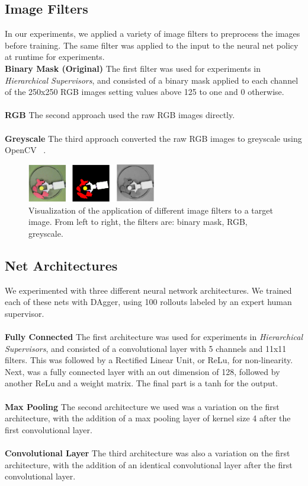 \documentclass[10pt, conference]{ieeeconf}      %
\begin{document}
\subsection{Image Filters}
In our experiments, we applied a variety of image filters to preprocess the images before training. The same filter was applied to the input to the neural net policy at runtime for experiments. \\
\textbf{Binary Mask (Original)}
The first filter was used for experiments in \textit{Hierarchical Supervisors}, and consisted of a binary mask applied to each channel of the 250x250 RGB images setting
values above 125 to one and 0 otherwise. \\
\\
\textbf{RGB}
The second approach used the raw RGB images directly. \\
\\
\textbf{Greyscale}
The third approach converted the raw RGB images to greyscale using OpenCV ~\cite{opencv}. 

\begin{figure}[t]
\centering

\includegraphics[width=0.5\textwidth]{f_figs/image_filters.png}

\caption{\footnotesize Visualization of the application of different image filters to a target image. From left to right, the filters are: binary mask, RGB, greyscale.}

\label{fig:image_filters}
\end{figure}

\subsection{Net Architectures}
We experimented with three different neural network architectures.  We trained each of these nets with DAgger, using 100 rollouts labeled by an expert human supervisor. \\
\\
\textbf{Fully Connected}
The first architecture was used for experiments in \textit{Hierarchical Supervisors}, and consisted of a convolutional layer with 5 channels and 11x11 filters.  This was followed by a Rectified Linear Unit, or ReLu, for non-linearity.  Next, was a fully connected layer with an out dimension of 128, followed by another ReLu and a weight matrix.  The final part is a tanh for the output. \\
\\
\textbf{Max Pooling}
The second architecture we used was a variation on the first architecture, with the addition of a max pooling layer of kernel size 4 after the first convolutional layer. \\
\\
\textbf{Convolutional Layer}
The third architecture was also a variation on the first architecture, with the addition of an identical convolutional layer after the first convolutional layer.
\end{document}
